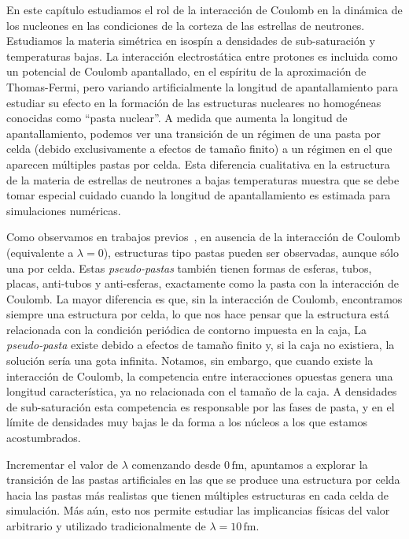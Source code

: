En este capítulo estudiamos el rol de la interacción de Coulomb en la dinámica de los nucleones en las condiciones de la corteza de las estrellas de neutrones.
Estudiamos la materia simétrica en isospín a densidades de sub-saturación y temperaturas bajas.
La interacción electrostática entre protones es incluida como un potencial de Coulomb apantallado, en el espíritu de la aproximación de Thomas-Fermi, pero variando artificialmente la longitud de apantallamiento para estudiar su efecto en la formación de las estructuras nucleares no homogéneas conocidas como ``pasta nuclear''.
A medida que aumenta la longitud de apantallamiento, podemos ver una transición de un régimen de una pasta por celda (debido exclusivamente a efectos de tamaño finito) a un régimen en el que aparecen múltiples pastas por celda.
Esta diferencia cualitativa en la estructura de la materia de estrellas de neutrones a bajas temperaturas muestra que se debe tomar especial cuidado cuando la longitud de apantallamiento es estimada para simulaciones numéricas.

Como observamos en trabajos previos~\cite{schneider_nuclear_2013,gimenez_molinelli_simulations_2014}, en ausencia de la interacción de Coulomb (equivalente a $\lambda=0$), estructuras tipo pastas pueden ser observadas, aunque sólo una por celda.
Estas \emph{pseudo-pastas} también tienen formas de esferas, tubos, placas, anti-tubos y anti-esferas, exactamente como la pasta con la interacción de Coulomb.
La mayor diferencia es que, sin la interacción de Coulomb, encontramos siempre una estructura por celda, lo que nos hace pensar que la estructura está relacionada con la condición periódica de contorno impuesta en la caja,
La \emph{pseudo-pasta} existe debido a efectos de tamaño finito y, si la caja no existiera, la solución sería una gota infinita.
Notamos, sin embargo, que cuando existe la interacción de Coulomb, la competencia entre interacciones opuestas genera una longitud característica, ya no relacionada con el tamaño de la caja.
A densidades de sub-saturación esta competencia es responsable por las fases de pasta, y en el límite de densidades muy bajas le da forma a los núcleos a los que estamos acostumbrados.

Incrementar el valor de $\lambda$ comenzando desde $0\,\text{fm}$, apuntamos a explorar la transición de las pastas artificiales en las que se produce una estructura por celda hacia las pastas más realistas que tienen múltiples estructuras en cada celda de simulación.
Más aún, esto nos permite estudiar las implicancias físicas del valor arbitrario y utilizado tradicionalmente de $\lambda=10\,\text{fm}$.

